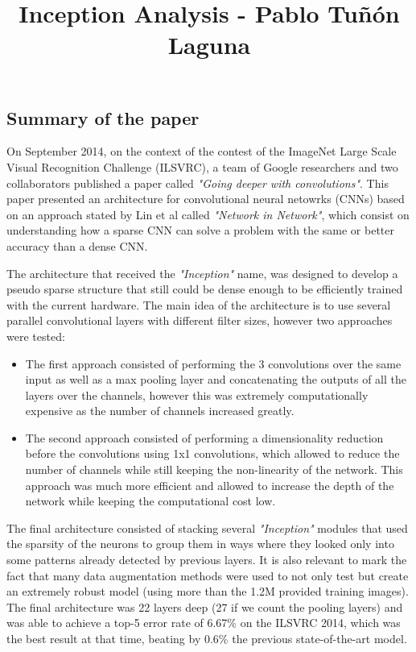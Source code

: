\documentclass[12pt]{article}
\title{\vspace{-3cm}\textbf{Inception Analysis - Pablo Tuñón Laguna}\vspace{-2cm}}
\begin{document}
\date{}

\maketitle

\subsection*{Summary of the paper}

On September 2014, on the context of the contest of the ImageNet Large Scale Visual Recognition Challenge (ILSVRC), a team of Google researchers
and two collaborators published a paper called \textit{"Going deeper with convolutions"}. This paper presented an architecture for convolutional neural
netowrks (CNNs) based on an approach stated by Lin et al called \textit{"Network in Network"}, which consist on understanding how a sparse CNN can solve 
a problem with the same or better accuracy than a dense CNN.

\vspace{0.5cm}

The architecture that received the \textit{"Inception"} name, was designed to develop a pseudo sparse structure that still could be dense enough to be 
efficiently trained with the current hardware. The main idea of the architecture is to use several parallel convolutional layers with different
filter sizes, however two approaches were tested:
\begin{itemize}
    \item The first approach consisted of performing the 3 convolutions over the same input as well as a max pooling layer and concatenating the 
outputs of all the layers over the channels, however this was extremely computationally expensive as the number of channels increased greatly.
    \item The second approach consisted of performing a dimensionality reduction before the convolutions using 1x1 convolutions, which allowed 
to reduce the number of channels while still keeping the non-linearity of the network. This approach was much more efficient and allowed to
increase the depth of the network while keeping the computational cost low.
\end{itemize}

\vspace{0.5cm}

The final architecture consisted of stacking several \textit{"Inception"} modules that used the sparsity of the neurons to group them in ways where they looked
only into some patterns already detected by previous layers. It is also relevant to mark the fact that many data augmentation methods were used to 
not only test but create an extremely robust model (using more than the 1.2M provided training images). The final architecture was 22 layers deep (27 if we count the pooling layers) and was
able to achieve a top-5 error rate of 6.67\% on the ILSVRC 2014, which was the best result at that time, beating by 0.6\% the previous state-of-the-art model.
\end{document}
